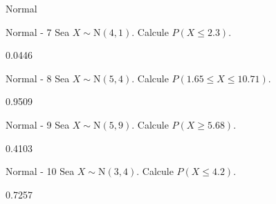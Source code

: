 \documentclass[a4,11pt]{aleph-notas}
\newcommand{\Norm}{\text{N}}
\begin{document}
\begin{quiz}{Normal}
\begin{numerical}[tolerance=0.01]%
    {Normal - 7}
    Sea \( X \sim \Norm(4, 1) \). Calcule \( P(X \leq 2.3) \).
    \item[] 0.0446
\end{numerical}

\begin{numerical}[tolerance=0.01]%
    {Normal - 8}
    Sea \( X \sim \Norm(5, 4) \). Calcule \( P(1.65 \leq X \leq 10.71) \).
    \item[] 0.9509
\end{numerical}

\begin{numerical}[tolerance=0.01]%
    {Normal - 9}
    Sea \( X \sim \Norm(5, 9) \). Calcule \( P(X \geq 5.68) \).
    \item[] 0.4103
\end{numerical}

\begin{numerical}[tolerance=0.01]%
    {Normal - 10}
    Sea \( X \sim \Norm(3, 4) \). Calcule \( P(X \leq 4.2) \).
    \item[] 0.7257
\end{numerical}




\end{quiz}
\end{document}
